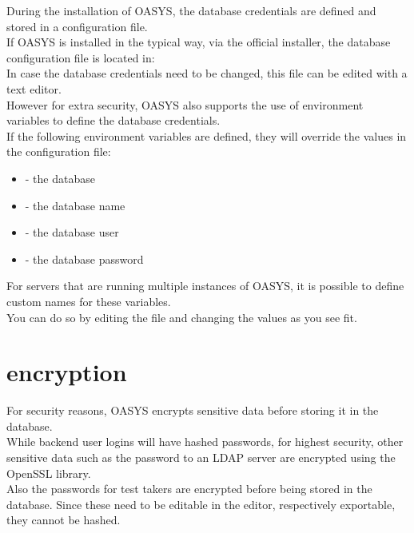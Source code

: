 \documentclass[12pt]{article} %
\begin{document}
    During the installation of OASYS, the database credentials are defined and stored in a configuration file.\\

    If OASYS is installed in the typical way, via the official installer, the database configuration file is located in: \\

    In case the database credentials need to be changed, this file can be edited with a text editor.\\

    However for extra security, OASYS also supports the use of environment variables to define the database credentials.\\

    If the following environment variables are defined, they will override the values in the configuration file:
    \begin{itemize}
        \item {} - the database
        \item {} - the database name
        \item {} - the database user
        \item {} - the database password
    \end{itemize}
    \vspace{0.3cm}

    For servers that are running multiple instances of OASYS, it is possible to define custom names for these variables.\\

    You can do so by editing the file  and changing the values as you see fit.\\

    \section{encryption}\label{sec:encryption}
    For security reasons, OASYS encrypts sensitive data before storing it in the database.\\

    While backend user logins will have hashed passwords, for highest security, other sensitive data such as the password to an LDAP server are encrypted using the OpenSSL library.\\

    Also the passwords for test takers are encrypted before being stored in the database. Since these need to be editable in the editor, respectively exportable, they cannot be hashed.\\
\end{document}
